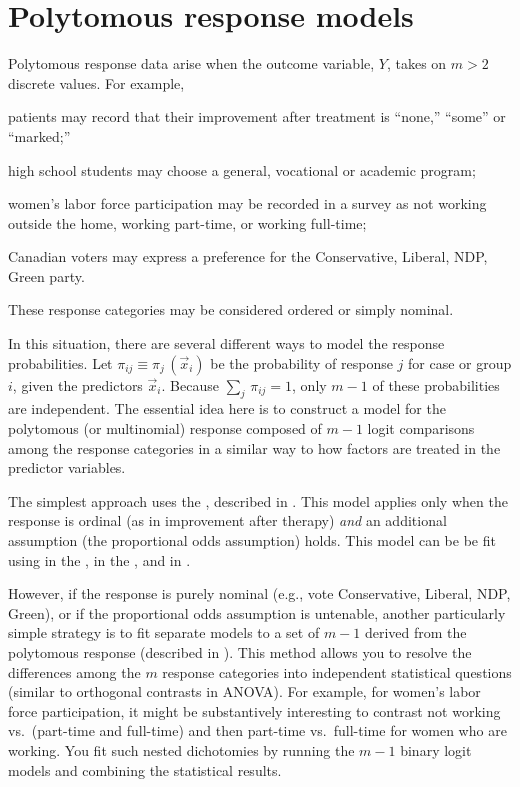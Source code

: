 \documentclass[11pt]{book}\usepackage[]{graphicx}\usepackage[]{color}
\begin{document}
\section{Polytomous response models}\label{sec:logist-poly}

Polytomous response data arise when the outcome variable, $Y$,
takes on $m > 2$ discrete values.  For example, 
\begin{seriate}
 \item patients may record that their improvement after treatment is ``none,''
``some'' or ``marked;''
 \item high school students may choose a general, vocational or
academic program;
 \item women's labor force participation may be recorded in a survey
 as not working outside the home, working part-time, or working full-time;
 \item Canadian voters may express a preference for
the Conservative, Liberal, NDP, Green party.
\end{seriate}
These response categories may be considered ordered or simply
nominal.

In this situation, there are several different
ways to model the response probabilities.  Let \(\pi_{ij} \equiv
\pi_j \,  ( \vec{x}_i )\) be the probability of response $j$ for case
or group $i$, given the predictors $\vec{x}_i$.
Because \(\sum_j \,  \pi_{ij} = 1\), only \(m - 1\) of
these probabilities are independent.  The essential idea here is to
construct a model for the polytomous (or multinomial)
response composed of $m-1$
logit comparisons among the response categories in a similar way
to how factors are treated in the predictor variables.

The simplest approach uses
the 
, described in .
This model applies only when the response is ordinal
(as in improvement after therapy)
\emph{and} an additional assumption
(the proportional odds assumption) holds. 
This model can be be fit using  in the ,
 in the , and  in .

However, if the
response is purely nominal (e.g., vote Conservative, Liberal, NDP, Green),
or if the proportional odds assumption is untenable, another particularly
simple strategy is to fit separate models to a set of \(m - 1\)
 derived from the polytomous response
(described in ). 
This method allows you to resolve the differences
among the $m$ response categories into independent statistical questions
(similar to orthogonal contrasts in ANOVA).
For example, for women's labor force participation, it might be 
substantively interesting to contrast not working vs.\  (part-time and full-time)
and then part-time vs.\ full-time for women who are working.
You fit such nested
dichotomies by running the $m-1$ binary logit models and combining the
statistical results.
\end{document}
